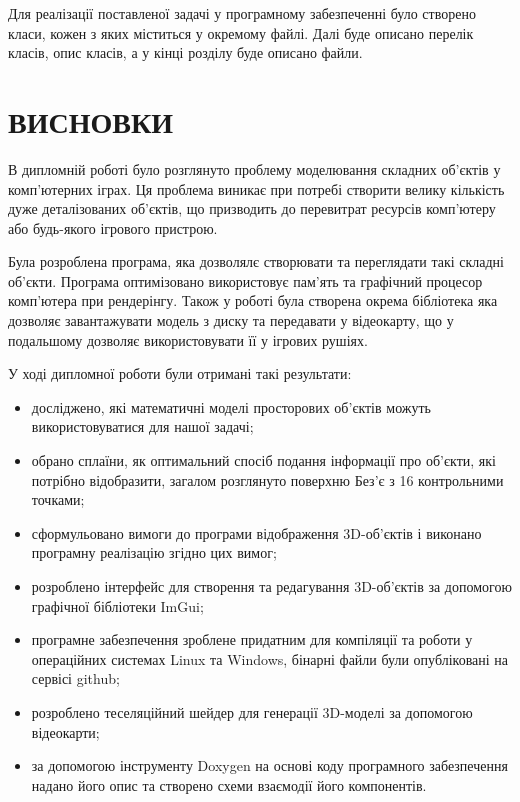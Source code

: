 \let\mypdfximage\pdfximage\def\pdfximage{\immediate\mypdfximage}\documentclass[14pt,a4paper]{extarticle}
\theoremstyle{definition}
\renewcommand{\[}{\begin{singlespace}\begin{equation*}}
\renewcommand{\]}{\end{equation*}\end{singlespace}}
\renewcommand{\+}{\discretionary{\mbox{\scriptsize$\hookleftarrow$}}{}{}}
\begin{document}
Для реалізації поставленої задачі у програмному забезпеченні було створено класи, кожен з яких міститься у окремому файлі. Далі буде описано перелік класів, опис класів, а у кінці розділу буде описано файли.



















\section*{ВИСНОВКИ}

В дипломній роботі було розглянуто проблему моделювання складних об'єктів у комп'ютерних іграх. Ця проблема виникає при потребі створити велику кількість дуже деталізованих об'єктів, що призводить до перевитрат ресурсів комп'ютеру або будь-якого ігрового пристрою.

Була розроблена програма, яка дозволялє створювати та переглядати такі складні об'єкти. Програма оптимізовано використовує пам'ять та графічний процесор комп'ютера при рендерінгу. Також у роботі була створена окрема бібліотека яка дозволяє завантажувати модель з диску та передавати у відеокарту, що у подальшому дозволяє використовувати її у ігрових рушіях.

У ході дипломної роботи були отримані такі результати:

\begin{itemize}
\item досліджено, які математичні моделі просторових об'єктів можуть використовуватися для нашої задачі;
\item обрано сплаїни, як оптимальний спосіб подання інформації про об'єкти, які потрібно відобразити, загалом розглянуто поверхню Без'є з 16 контрольними точками;
\item сформульовано вимоги до програми відображення 3D-об'єктів і виконано програмну реалізацію згідно цих вимог;
\item розроблено інтерфейс для створення та редагування 3D-об'єктів за допомогою графічної бібліотеки ImGui;
\item програмне забезпечення зроблене придатним для компіляції та роботи у операційних системах Linux та Windows, бінарні файли були опубліковані на сервісі github;
\item розроблено теселяційний шейдер для генерації 3D-моделі за допомогою відеокарти;
\item за допомогою інструменту Doxygen на основі коду програмного забезпечення надано його опис та створено схеми взаємодії його компонентів.
\end{itemize}
\end{document}
